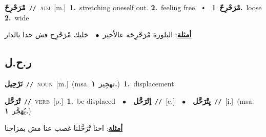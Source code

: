 \documentclass[10pt,a4paper,twoside]{article} %
\begin{document}
\begin{multicols}{2}
{\setlength\topsep{0pt}\textbf{\foreignlanguage{arabic}{مْرَحْرِحّ}}\ {\color{gray}\texttt{//}\color{black}}\ \textsc{adj}\ [m.]\ \textbf{1.}~stretching oneself out.  \textbf{2.}~feeling free\ \ $\smblkdiamond$\ \ \setlength\topsep{0pt}\textbf{\foreignlanguage{arabic}{مْرَحْرِحّ}}\ \textbf{1.}~loose  \textbf{2.}~wide\  \begin{flushright}\color{gray}\foreignlanguage{arabic}{\textbf{\underline{\foreignlanguage{arabic}{أمثلة}}}: البلوزة مْرَحْرِحَة عالأخير\ $\bullet$\ \  خليك مْرَحْرِح فش حدا بالدار}\end{flushright}\color{black}} \vspace{2mm}

\vspace{-3mm}
\subsection*{\color{blue}\foreignlanguage{arabic}{ر.ح.ل}\color{blue}{}} 

{\setlength\topsep{0pt}\textbf{\foreignlanguage{arabic}{تَرْحِيل}}\ {\color{gray}\texttt{//}\color{black}}\ \textsc{noun}\ [m.]\ \color{gray}(msa. \foreignlanguage{arabic}{تهجِير}~\foreignlanguage{arabic}{\textbf{١.}})\color{black}\ \textbf{1.}~displacement\ } \vspace{2mm}

{\setlength\topsep{0pt}\textbf{\foreignlanguage{arabic}{تْرَحَّل}}\ {\color{gray}\texttt{//}\color{black}}\ \textsc{verb}\ [p.]\ \textbf{1.}~be displaced\ \ $\bullet$\ \ \setlength\topsep{0pt}\textbf{\foreignlanguage{arabic}{اِتْرَحَّل}}\ {\color{gray}\texttt{//}\color{black}}\ [c.]\ \ $\bullet$\ \ \setlength\topsep{0pt}\textbf{\foreignlanguage{arabic}{يِتْرَحَّل}}\ {\color{gray}\texttt{//}\color{black}}\ [i.]\ \color{gray}(msa. \foreignlanguage{arabic}{يُهَجَّر}~\foreignlanguage{arabic}{\textbf{١.}})\color{black}\  \begin{flushright}\color{gray}\foreignlanguage{arabic}{\textbf{\underline{\foreignlanguage{arabic}{أمثلة}}}: احنا تْرَحَّلنا غصب عنا مش بمزاجنا}\end{flushright}\color{black}} \vspace{2mm}


\end{multicols}
\end{document}
